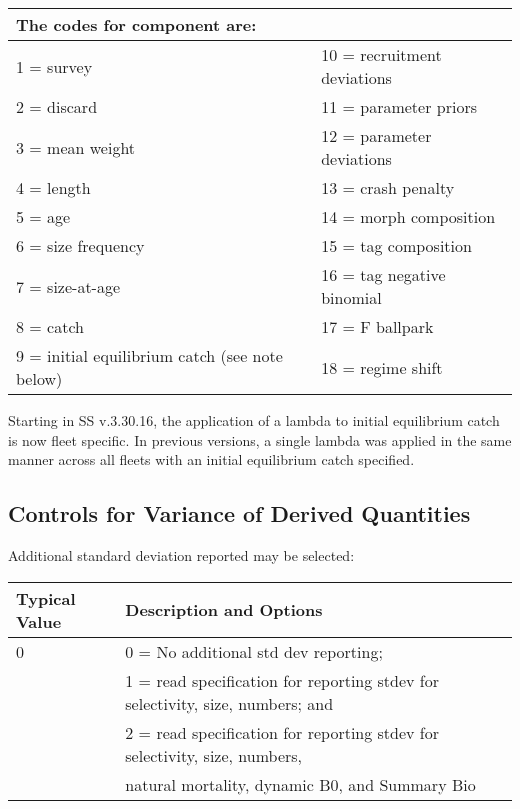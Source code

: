 \begin{center}
	\begin{longtable}{ p{7.5cm} p{7.5cm} }
		\multicolumn{2}{l}{The codes for component are:}\\
		\hline
		1 = survey  				   & 10 = recruitment deviations \Tstrut\\	
		2 = discard 				   & 11 = parameter priors\\		
		3 = mean weight 			   & 12 = parameter deviations\\	
		4 = length 					   & 13 = crash penalty\\		
		5 = age 					   & 14 = morph composition\\
		6 = size frequency  		   & 15 = tag composition\\		
		7 = size-at-age 			   & 16 = tag negative binomial\\
		8 = catch 					   & 17 = F ballpark\\		
		9 = initial equilibrium catch (see note below) & 18 = regime shift \Bstrut\\
		\hline
	\end{longtable}
\end{center}

Starting in SS v.3.30.16, the application of a lambda to initial equilibrium catch is now fleet specific.  In previous versions, a single lambda was applied in the same manner across all fleets with an initial equilibrium catch specified.

\pagebreak

\subsection{Controls for Variance of Derived Quantities}
Additional standard deviation reported may be selected:

\begin{longtable}{p{1.1cm} p{1.4cm} p{1.2cm} p{1.2cm} p{1.3cm} p{1.6cm} p{1.4cm} p{1.4cm} p{1.4cm}}

	\hline
	\multicolumn{3}{l}{Typical Value} & \multicolumn{6}{l}{Description and Options}\Tstrut\Bstrut\\
	\hline
	\endfirsthead


	\multicolumn{3}{l}{0} & \multicolumn{6}{l}{0 = No additional std dev reporting;} \Tstrut\\
	\multicolumn{3}{l}{ } & \multicolumn{6}{l}{1 = read specification for reporting stdev for selectivity, size, numbers; and}\Bstrut\\
	\multicolumn{3}{l}{ } & \multicolumn{6}{l}{2 = read specification for reporting stdev for selectivity, size, numbers, }\Bstrut\\
	\multicolumn{3}{l}{ } & \multicolumn{6}{l}{natural mortality, dynamic B0, and Summary Bio}\Bstrut\\
	\hline

\end{longtable}

